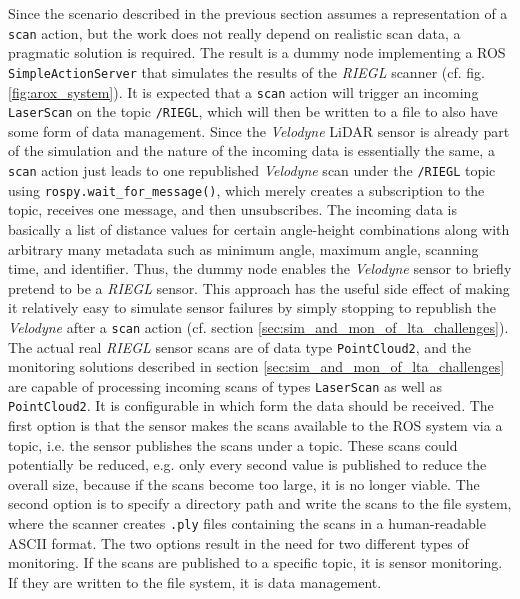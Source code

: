 \documentclass[english, master, utf8]{base/thesis_KBS}
\newcommand{\code}[1]{\colorbox{light-gray}{\texttt{#1}}}
\begin{document}
Since the scenario described in the previous section assumes a representation of a \code{scan} action, but the work does not really depend on realistic scan data,
a pragmatic solution is required. The result is a dummy node implementing a ROS \code{SimpleActionServer} that simulates the results of the \textit{RIEGL} scanner
(cf. fig. \ref{fig:arox_system}). It is expected that a \code{scan} action will trigger an incoming \code{LaserScan} on the topic \code{/RIEGL}, which will then be
written to a file to also have some form of data management. Since the \textit{Velodyne} LiDAR sensor is already part of the simulation and the nature of the incoming data
is essentially the same, a \code{scan} action just leads to one republished \textit{Velodyne} scan under the \code{/RIEGL} topic using \code{rospy.wait\_for\_message()},
which merely creates a subscription to the topic, receives one message, and then unsubscribes. The incoming data is basically a list of distance values for certain angle-height 
combinations along with arbitrary many metadata such as minimum angle, maximum angle, scanning time, and identifier. Thus, the dummy node enables the \textit{Velodyne} sensor
to briefly pretend to be a \textit{RIEGL} sensor. This approach has the useful side effect of making it relatively easy to simulate sensor failures by simply stopping to
republish the \textit{Velodyne} after a \code{scan} action (cf. section \ref{sec:sim_and_mon_of_lta_challenges}).\newline
The actual real \textit{RIEGL} sensor scans are of data type \code{PointCloud2}, and the monitoring solutions described in section \ref{sec:sim_and_mon_of_lta_challenges}
are capable of processing incoming scans of types \code{LaserScan} as well as \code{PointCloud2}. It is configurable in which form the data should be received. The first
option is that the sensor makes the scans available to the ROS system via a topic, i.e. the sensor publishes the scans under a topic. These scans could potentially be reduced,
e.g. only every second value is published to reduce the overall size, because if the scans become too large, it is no longer viable. The second option is to specify a 
directory path and write the scans to the file system, where the scanner creates \code{.ply} files containing the scans in a human-readable ASCII format.
The two options result in the need for two different types of monitoring. If the scans are published to a specific topic, it is sensor monitoring.
If they are written to the file system, it is data management.
\end{document}
